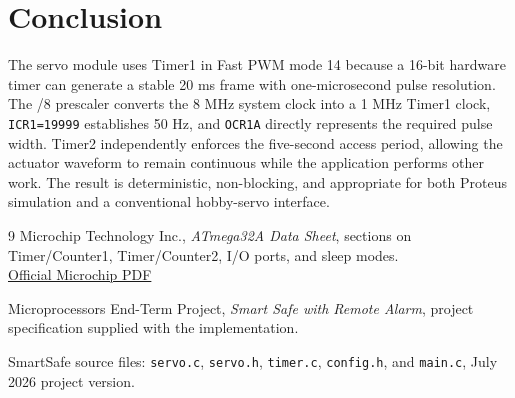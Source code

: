\documentclass[11pt,a4paper]{article}
\begin{document}
\section{Conclusion}
The servo module uses Timer1 in Fast PWM mode 14 because a 16-bit hardware timer can generate a stable 20 ms frame with one-microsecond pulse resolution. The /8 prescaler converts the 8 MHz system clock into a 1 MHz Timer1 clock, \texttt{ICR1=19999} establishes 50 Hz, and \texttt{OCR1A} directly represents the required pulse width. Timer2 independently enforces the five-second access period, allowing the actuator waveform to remain continuous while the application performs other work. The result is deterministic, non-blocking, and appropriate for both Proteus simulation and a conventional hobby-servo interface.

\begin{thebibliography}{9}
Microchip Technology Inc., \emph{ATmega32A Data Sheet}, sections on Timer/Counter1, Timer/Counter2, I/O ports, and sleep modes.\\
\href{https://ww1.microchip.com/downloads/en/DeviceDoc/Atmega32A-Data-Sheet-DS40002072A.pdf}{Official Microchip PDF}

Microprocessors End-Term Project, \emph{Smart Safe with Remote Alarm}, project specification supplied with the implementation.

SmartSafe source files: \texttt{servo.c}, \texttt{servo.h}, \texttt{timer.c}, \texttt{config.h}, and \texttt{main.c}, July 2026 project version.
\end{thebibliography}
\end{document}
